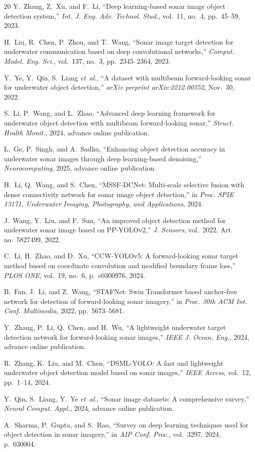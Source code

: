 \documentclass[conference]{IEEEtran}
\begin{document}
\begin{thebibliography}{20}
Y.~Zhang, Z.~Xu, and F.~Li, ``Deep learning-based sonar image object detection system,'' \textit{Int. J. Eng. Adv. Technol. Stud.}, vol.~11, no.~4, pp.~45--59, 2023.

H.~Liu, R.~Chen, P.~Zhou, and T.~Wang, ``Sonar image target detection for underwater communication based on deep convolutional networks,'' \textit{Comput. Model. Eng. Sci.}, vol.~137, no.~3, pp.~2345--2364, 2023.

Y.~Ye, Y.~Qin, S.~Liang \textit{et~al.}, ``A dataset with multibeam forward-looking sonar for underwater object detection,'' \textit{arXiv preprint arXiv:2212.00352}, Nov.~30, 2022.

S.~Li, P.~Wang, and L.~Zhao, ``Advanced deep learning framework for underwater object detection with multibeam forward-looking sonar,'' \textit{Struct. Health Monit.}, 2024, advance online publication.

L.~Ge, P.~Singh, and A.~Sadhu, ``Enhancing object detection accuracy in underwater sonar images through deep learning-based denoising,'' \textit{Neurocomputing}, 2025, advance online publication.

H.~Li, Q.~Wang, and S.~Chen, ``MSSF-DCNet: Multi-scale selective fusion with dense connectivity network for sonar image object detection,'' in \textit{Proc. SPIE 13171, Underwater Imaging, Photography, and Applications}, 2024.

J.~Wang, Y.~Liu, and F.~Sun, ``An improved object detection method for underwater sonar image based on PP-YOLOv2,'' \textit{J. Sensors}, vol.~2022, Art. no.~5827499, 2022.

C.~Li, H.~Zhao, and D.~Xu, ``CCW-YOLOv5: A forward-looking sonar target method based on coordinate convolution and modified boundary frame loss,'' \textit{PLOS ONE}, vol.~19, no.~6, p.~e0300976, 2024.

B.~Fan, J.~Li, and Z.~Wang, ``STAFNet: Swin Transformer based anchor-free network for detection of forward-looking sonar imagery,'' in \textit{Proc. 30th ACM Int. Conf. Multimedia}, 2022, pp.~5673--5681.

Y.~Zhang, P.~Li, Q.~Chen, and H.~Wu, ``A lightweight underwater target detection network for forward-looking sonar images,'' \textit{IEEE J. Ocean. Eng.}, 2024, advance online publication.

R.~Zhang, K.~Liu, and M.~Chen, ``DSML-YOLO: A fast and lightweight underwater object detection model based on sonar images,'' \textit{IEEE Access}, vol.~12, pp.~1--14, 2024.

Y.~Qin, S.~Liang, Y.~Ye \textit{et~al.}, ``Sonar image datasets: A comprehensive survey,'' \textit{Neural Comput. Appl.}, 2024, advance online publication.

A.~Sharma, P.~Gupta, and S.~Rao, ``Survey on deep learning techniques used for object detection in sonar imagery,'' in \textit{AIP Conf. Proc.}, vol.~3297, 2024, p.~030004.

\end{thebibliography}
\end{document}
